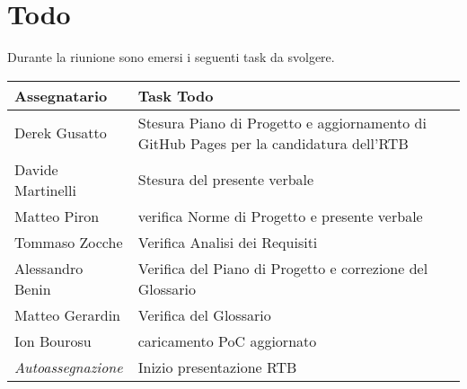 \section{Todo}
Durante la riunione sono emersi i seguenti task da svolgere.

\begin{center}
  \begin{tabular}{|p{5cm}|p{8cm}|}
    \hline
    \textbf{Assegnatario}       & \textbf{Task Todo} \\ \hline
    Derek Gusatto & Stesura Piano di Progetto e aggiornamento di GitHub Pages per la candidatura dell'RTB \\ \hline
    Davide Martinelli & Stesura del presente verbale \\ \hline
    Matteo Piron & verifica Norme di Progetto e presente verbale \\ \hline
    Tommaso Zocche & Verifica Analisi dei Requisiti \\ \hline
    Alessandro Benin & Verifica del Piano di Progetto e correzione del Glossario \\ \hline
    Matteo Gerardin & Verifica del Glossario \\ \hline
    Ion Bourosu & caricamento PoC aggiornato \\ \hline
    \textit{Autoassegnazione} & Inizio presentazione RTB \\ \hline
  \end{tabular}
\end{center}